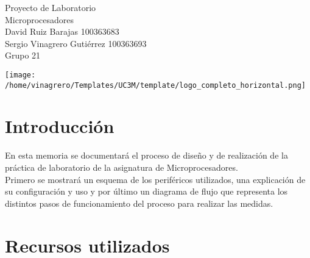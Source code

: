 \documentclass[a4paper, 12pt]{article}
\begin{document}
\begin{titlepage}


  \vspace*{5cm}
  \hspace*{0cm}\hfill{\fontsize{35}{40}\selectfont Proyecto de Laboratorio}\\

  \hspace{3cm}\hfill {\fontsize{18}{10}\selectfont Microprocesadores}\\

  \vspace*{2cm}
  \hspace*{3cm}\hfill David Ruiz Barajas 100363683\\
  \hspace*{3cm}\hfill Sergio Vinagrero Gutiérrez 100363693\\

  \hfill Grupo 21
  
  \vspace*{3cm}
  \hfill\texttt{[image: /home/vinagrero/Templates/UC3M/template/logo\_completo\_horizontal.png]}

\thispagestyle{empty}
\end{titlepage}

\newpage

\tableofcontents
\thispagestyle{empty}

\newpage

\section{Introducción}

En esta memoria se documentará el proceso de diseño y de realización de la práctica de laboratorio de la asignatura de Microprocesadores.\\

Primero se mostrará un esquema de los periféricos utilizados, una explicación de su configuración y uso y por último  un diagrama de flujo que representa los distintos pasos de funcionamiento del proceso para realizar las medidas.

\section{Recursos utilizados}
\end{document}
